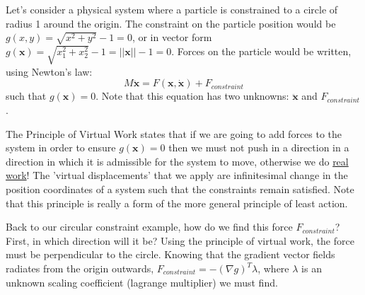 \documentclass{article}
\begin{document}
Let's consider a physical system where a particle is constrained to a circle of radius 1 around the origin. The constraint on the particle position would be $g(x,y) = \sqrt{x^2+y^2} - 1 = 0$, or in vector form $g(\mathbf{x}) = \sqrt{x_1^2+x_2^2} - 1 = ||\mathbf{x}|| -1 = 0$. Forces on the particle would be written, using Newton's law:
\[
M \mathbf{\ddot{x}} = F(\mathbf{x}, \mathbf{\dot{x}}) + F_{constraint}
\]
such that $g(\mathbf{x}) = 0$. Note that this equation has two unknowns: $\mathbf{\ddot{x}}$ and $F_{constraint}$.

The Principle of Virtual Work states that if we are going to add forces to the system in order to ensure $g(\mathbf{x})=0$ then we must not push in a direction in a direction in which it is admissible for the system to move, otherwise we do \underline{real work}! The 'virtual displacements' that we apply are inﬁnitesimal change in the position coordinates of a system such that the constraints remain satisfied. Note that this principle is really a form of the more general principle of least action.

Back to our circular constraint example, how do we find this force $F_{constraint}$? First, in which direction will it be? Using the principle of virtual work, the force must be perpendicular to the circle. Knowing that the gradient vector fields radiates from the origin outwards, $F_{constraint} = - (\nabla g)^T \lambda $, where $\lambda$ is an unknown scaling coefficient (lagrange multiplier) we must find. 
\end{document}
